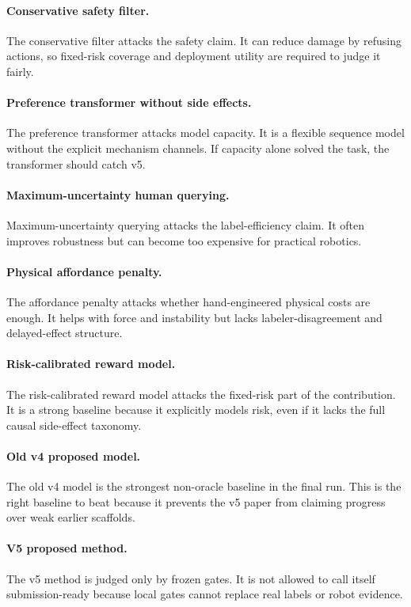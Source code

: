\documentclass{article}
\begin{document}
\paragraph{Conservative safety filter.}
The conservative filter attacks the safety claim. It can reduce damage by refusing actions, so fixed-risk coverage and deployment utility are required to judge it fairly.

\paragraph{Preference transformer without side effects.}
The preference transformer attacks model capacity. It is a flexible sequence model without the explicit mechanism channels. If capacity alone solved the task, the transformer should catch v5.

\paragraph{Maximum-uncertainty human querying.}
Maximum-uncertainty querying attacks the label-efficiency claim. It often improves robustness but can become too expensive for practical robotics.

\paragraph{Physical affordance penalty.}
The affordance penalty attacks whether hand-engineered physical costs are enough. It helps with force and instability but lacks labeler-disagreement and delayed-effect structure.

\paragraph{Risk-calibrated reward model.}
The risk-calibrated reward model attacks the fixed-risk part of the contribution. It is a strong baseline because it explicitly models risk, even if it lacks the full causal side-effect taxonomy.

\paragraph{Old v4 proposed model.}
The old v4 model is the strongest non-oracle baseline in the final run. This is the right baseline to beat because it prevents the v5 paper from claiming progress over weak earlier scaffolds.

\paragraph{V5 proposed method.}
The v5 method is judged only by frozen gates. It is not allowed to call itself submission-ready because local gates cannot replace real labels or robot evidence.
\end{document}
